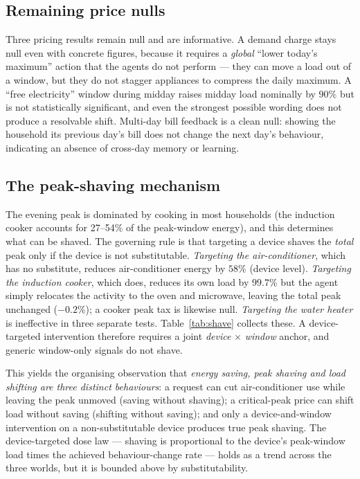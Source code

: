 \documentclass[11pt]{article}
\begin{document}
\subsection{Remaining price nulls}
Three pricing results remain null and are informative. A demand charge stays null even with concrete
figures, because it requires a \emph{global} ``lower today's maximum'' action that the agents do not
perform --- they can move a load out of a window, but they do not stagger appliances to compress the daily
maximum. A ``free electricity'' window during midday raises midday load nominally by $90\%$ but is not
statistically significant, and even the strongest possible wording does not produce a resolvable shift.
Multi-day bill feedback is a clean null: showing the household its previous day's bill does not change the
next day's behaviour, indicating an absence of cross-day memory or learning.

\subsection{The peak-shaving mechanism}
The evening peak is dominated by cooking in most households (the induction cooker accounts for
27--54\% of the peak-window energy), and this determines what can be shaved. The governing rule is that
targeting a device shaves the \emph{total} peak only if the device is not substitutable.
\emph{Targeting the air-conditioner}, which has no substitute, reduces air-conditioner energy by $58\%$
(device level). \emph{Targeting the induction cooker}, which does, reduces its own load by $99.7\%$ but
the agent simply relocates the activity to the oven and microwave, leaving the total peak unchanged
($-0.2\%$); a cooker peak tax is likewise null. \emph{Targeting the water heater} is ineffective in three
separate tests. Table~\ref{tab:shave} collects these. A device-targeted intervention therefore requires a
joint \emph{device} $\times$ \emph{window} anchor, and generic window-only signals do not shave.

This yields the organising observation that \emph{energy saving, peak shaving and load shifting are three
distinct behaviours}: a request can cut air-conditioner use while leaving the peak unmoved (saving
without shaving); a critical-peak price can shift load without saving (shifting without saving); and only
a device-and-window intervention on a non-substitutable device produces true peak shaving. The
device-targeted dose law --- shaving is proportional to the device's peak-window load times the achieved
behaviour-change rate --- holds as a trend across the three worlds, but it is bounded above by
substitutability.
\end{document}
